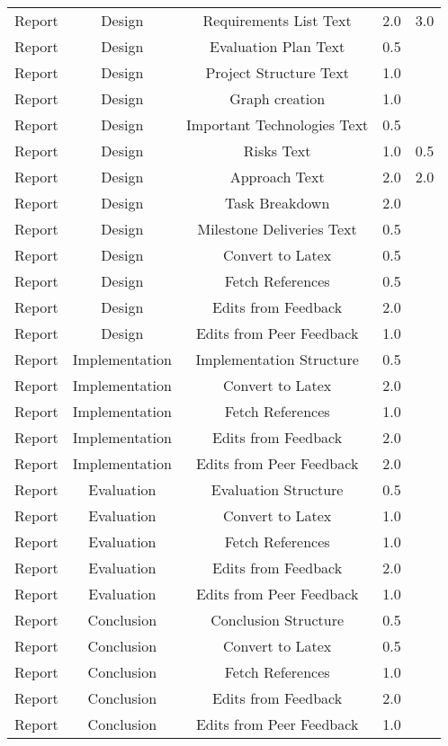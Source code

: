 \begin{longtable}{|c|c|c|c|c|}
	Report & Design & Requirements List Text & 2.0 & 3.0 \\
	Report & Design & Evaluation Plan Text & 0.5 &  \\
	Report & Design & Project Structure Text & 1.0 &  \\
	Report & Design & Graph creation & 1.0 &  \\
	Report & Design & Important Technologies Text & 0.5 &  \\
	Report & Design & Risks Text & 1.0 & 0.5 \\
	Report & Design & Approach Text & 2.0 & 2.0 \\
	Report & Design & Task Breakdown & 2.0 &  \\
	Report & Design & Milestone Deliveries Text & 0.5 &  \\
	Report & Design & Convert to Latex & 0.5 &  \\
	Report & Design & Fetch References & 0.5 &  \\
	Report & Design & Edits from Feedback & 2.0 &  \\
	Report & Design & Edits from Peer Feedback & 1.0 &  \\
	Report & Implementation & Implementation Structure & 0.5 &  \\
	Report & Implementation & Convert to Latex & 2.0 &  \\
	Report & Implementation & Fetch References & 1.0 &  \\
	Report & Implementation & Edits from Feedback & 2.0 &  \\
	Report & Implementation & Edits from Peer Feedback & 2.0 &  \\
	Report & Evaluation & Evaluation Structure & 0.5 &  \\
	Report & Evaluation & Convert to Latex & 1.0 &  \\
	Report & Evaluation & Fetch References & 1.0 &  \\
	Report & Evaluation & Edits from Feedback & 2.0 &  \\
	Report & Evaluation & Edits from Peer Feedback & 1.0 &  \\
	Report & Conclusion & Conclusion Structure & 0.5 &  \\
	Report & Conclusion & Convert to Latex & 0.5 &  \\
	Report & Conclusion & Fetch References & 1.0 &  \\
	Report & Conclusion & Edits from Feedback & 2.0 &  \\
	Report & Conclusion & Edits from Peer Feedback & 1.0 &  \\

\end{longtable}

